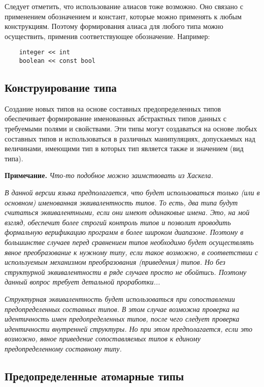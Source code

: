 {Следует отметить, что использование алиасов тоже возможно. Оно связано с применением обозначением и констант, которые можно применять к любым конструкциям. Поэтому формирования алиаса для любого типа можно осуществить, применив соответствующее обозначение. Например:

\begin{verbatim}
    integer << int
    boolean << const bool
\end{verbatim}

\subsection{Конструирование типа}

Создание новых типов на основе составных предопределенных типов обеспечивает формирование именованных абстрактных типов данных с требуемыми полями и свойствами. Эти типы могут создаваться на основе любых составных типов и использоваться в различных манипуляциях, допускаемых над величинами, имеющими тип в которых тип является также и значением (вид типа).

\textbf{Примечание.}
\textit{Что-то подобное можно заимствовать из Хаскела.}

\textit{В данной версии языка предполагается, что будет использоваться только (или в основном) именованная эквивалентность типов. То есть, два типа будут считаться эквивалентными, если они имеют одинаковые имена. Это, на мой взгляд, обеспечит более строгий контроль типов и позволит проводить формальную верификацию программ в более широком диапазоне. Поэтому в большинстве случаев перед сравнением типов необходимо будет осуществлять явное преобразование к нужному типу, если такое возможно, в соответствии с используемым механизмом преобразования (приведения) типов. Но без структурной эквивалентности в ряде случаев просто не обойтись. Поэтому данный вопрос требует детальной проработки...}

\textit{Структурная эквивалентность будет использоваться при сопоставлении предопределенных составных типов. В этом случае возможна проверка на идентичность имен предопределенных типов, после чего следует проверка идентичности внутренней структуры. Но при этом предполагается, если это возможно, явное приведение сопоставляемых типов к единому предопределенному составному типу.}

\subsection{Предопределенные атомарные типы}

}
